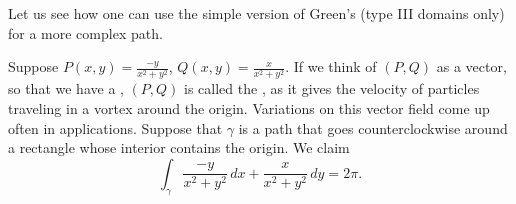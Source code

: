 Let us see how one can use the simple version of Green's (type III domains
only) for a more complex path.

\begin{example}
Suppose $P(x,y) = \frac{-y}{x^2+y^2}$, 
$Q(x,y) = \frac{x}{x^2+y^2}$.  If we think of $(P,Q)$ as a vector, so that
we have a \emph{}, $(P,Q)$ is
called the \emph{}, as it gives the velocity
of particles traveling in a vortex around the origin.  Variations on this
vector field come up often in applications.
Suppose that $\gamma$ is a path that goes counterclockwise around
a rectangle whose interior contains the origin.
We claim
\begin{equation*}
\int_{\gamma} \frac{-y}{x^2+y^2} \, dx + \frac{x}{x^2+y^2} \, dy = 2 \pi .
\end{equation*}


\end{example}
